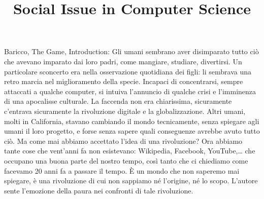 \documentclass[11pt, a4page, twocolumn]{article}
\title{\textbf{Social Issue in Computer Science}}
\date{}
\begin{document}
\maketitle
Baricco, The Game, Introduction:
Gli umani sembrano aver disimparato tutto ciò che avevano imparato dai loro padri, come mangiare, studiare, divertirsi. Un particolare sconcerto era nella osservazione quotidiana dei figli: li sembrava una retro marcia nel miglioramento della specie. Incapaci di concentrarsi, sempre attaccati a qualche computer, si intuiva l’annuncio di qualche crisi e l’imminenza di una apocalisse culturale. La faccenda non era chiarissima, sicuramente c’entrava sicuramente la rivoluzione digitale e la globalizzazione. Altri umani, molti in California, stavano cambiando il mondo tecnicamente, senza spiegare agli umani il loro progetto, e forse senza sapere quali conseguenze avrebbe avuto tutto ciò. Ma come mai abbiamo accettato l’idea di una rivoluzione? Ora abbiamo tante cose che vent’anni fa non esistevano: Wikipedia, Facebook, YouTube,… che occupano una buona parte del nostro tempo, così tanto che ci chiediamo come facevamo 20 anni fa a passare il tempo. È un mondo che non saperemo mai spiegare, è una rivoluzione di cui non sappiamo né l’origine, né lo scopo. L’autore sente l’emozione della paura nei confronti di tale rivoluzione.
\end{document}
